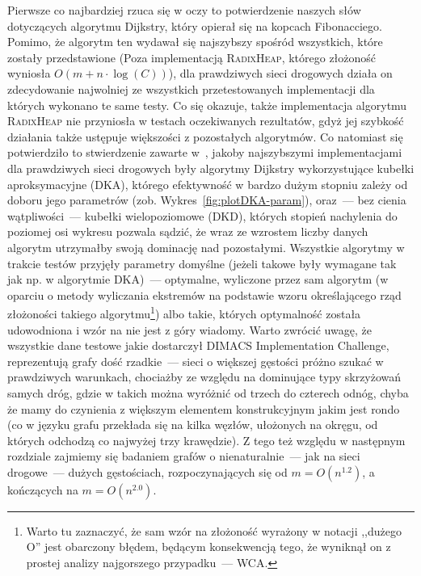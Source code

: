 Pierwsze co najbardziej rzuca się w oczy to potwierdzenie naszych słów dotyczących algorytmu Dijkstry, który opierał się na kopcach Fibonacciego.
Pomimo, że algorytm ten wydawał się najszybszy spośród wszystkich, które zostały przedstawione (Poza implementacją \textsc{RadixHeap}, którego złożoność wyniosła $O \left( m + n \cdot \log \left( C\right) \right)$), dla prawdziwych sieci drogowych działa on zdecydowanie najwolniej ze wszystkich przetestowanych implementacji dla których wykonano te same testy.
Co się okazuje, także implementacja algorytmu \textsc{RadixHeap} nie przyniosła w testach oczekiwanych rezultatów, gdyż jej szybkość działania także ustępuje większości z pozostałych algorytmów.
Co natomiast się potwierdziło to stwierdzenie zawarte w~\cite{GIDA}, jakoby najszybszymi implementacjami dla prawdziwych sieci drogowych były algorytmy Dijkstry wykorzystujące kubełki aproksymacyjne (\textsc{DKA}), którego efektywność w bardzo dużym stopniu zależy od doboru jego parametrów (zob. Wykres~\ref{fig:plotDKA-param}), oraz~--- bez cienia wątpliwości~--- kubełki wielopoziomowe (\textsc{DKD}), których stopień nachylenia do poziomej osi wykresu pozwala sądzić, że wraz ze wzrostem liczby danych algorytm utrzymałby swoją dominację nad pozostałymi.
Wszystkie algorytmy w trakcie testów przyjęły parametry domyślne (jeżeli takowe były wymagane tak jak np. w algorytmie \textsc{DKA})~--- optymalne, wyliczone przez sam algorytm (w oparciu o metody wyliczania ekstremów na podstawie wzoru określającego rząd złożoności takiego algorytmu\footnote{
	Warto tu zaznaczyć, że sam wzór na złożoność wyrażony w notacji ,,dużego \textsc{O}'' jest obarczony błędem, będącym konsekwencją tego, że wyniknął on z prostej analizy najgorszego przypadku~--- \textsc{WCA}.
}) albo takie, których optymalność została udowodniona i wzór na nie jest z góry wiadomy.
Warto zwrócić uwagę, że wszystkie dane testowe jakie dostarczył \textsf{DIMACS Implementation Challenge}, reprezentują grafy dość rzadkie~--- sieci o większej gęstości próżno szukać w prawdziwych warunkach, chociażby ze względu na dominujące typy skrzyżowań samych dróg, gdzie w takich można wyróżnić od trzech do czterech odnóg, chyba że mamy do czynienia z większym elementem konstrukcyjnym jakim jest rondo (co w języku grafu przekłada się na kilka węzłów, ułożonych na okręgu, od których odchodzą co najwyżej trzy krawędzie).
Z tego też względu w następnym rozdziale zajmiemy się badaniem grafów o nienaturalnie~--- jak na sieci drogowe~--- dużych gęstościach, rozpoczynających się od $m = O \left( n^{1.2} \right)$, a kończących na $m = O \left( n^{2.0} \right)$.




